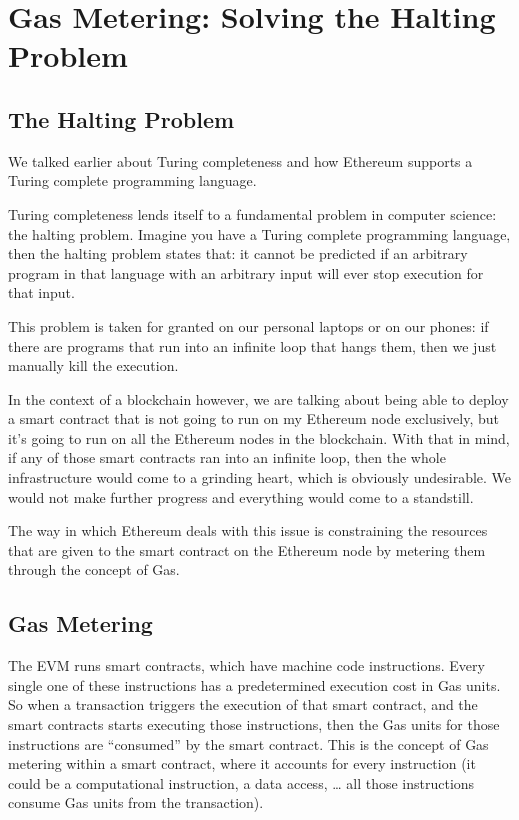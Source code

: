 \section{Gas Metering: Solving the Halting
Problem}\label{gas-metering-solving-the-halting-problem}

\subsection{The Halting Problem}\label{the-halting-problem}

We talked earlier about Turing completeness and how Ethereum supports a
Turing complete programming language.

Turing completeness lends itself to a fundamental problem in computer
science: the halting problem. Imagine you have a Turing complete
programming language, then the halting problem states that: it cannot be
predicted if an arbitrary program in that language with an arbitrary
input will ever stop execution for that input.

This problem is taken for granted on our personal laptops or on our
phones: if there are programs that run into an infinite loop that hangs
them, then we just manually kill the execution.

In the context of a blockchain however, we are talking about being able
to deploy a smart contract that is not going to run on my Ethereum node
exclusively, but it's going to run on all the Ethereum nodes in the
blockchain. With that in mind, if any of those smart contracts ran into
an infinite loop, then the whole infrastructure would come to a grinding
heart, which is obviously undesirable. We would not make further
progress and everything would come to a standstill.

The way in which Ethereum deals with this issue is constraining the
resources that are given to the smart contract on the Ethereum node by
metering them through the concept of Gas.

\subsection{Gas Metering}\label{gas-metering}

The EVM runs smart contracts, which have machine code instructions.
Every single one of these instructions has a predetermined execution
cost in Gas units. So when a transaction triggers the execution of that
smart contract, and the smart contracts starts executing those
instructions, then the Gas units for those instructions are ``consumed''
by the smart contract. This is the concept of Gas metering within a
smart contract, where it accounts for every instruction (it could be a
computational instruction, a data access, \ldots{} all those
instructions consume Gas units from the transaction).

